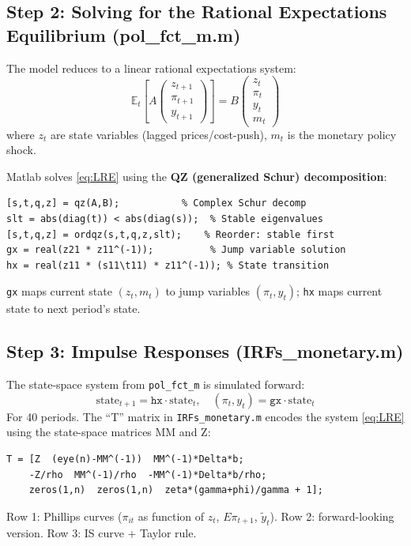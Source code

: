 \documentclass[12pt]{article}
\begin{document}
\subsection{Step 2: Solving for the Rational Expectations Equilibrium (pol\_fct\_m.m)}

The model reduces to a linear rational expectations system:
\begin{equation}
    \mathbb{E}_t\left[A \begin{pmatrix}z_{t+1}\\\pi_{t+1}\\y_{t+1}\end{pmatrix}\right] = B \begin{pmatrix}z_t\\\pi_t\\y_t\\m_t\end{pmatrix}
    \label{eq:LRE}
\end{equation}
where $z_t$ are state variables (lagged prices/cost-push), $m_t$ is the monetary policy shock.

Matlab solves \eqref{eq:LRE} using the \textbf{QZ (generalized Schur) decomposition}:
\begin{verbatim}
[s,t,q,z] = qz(A,B);           % Complex Schur decomp
slt = abs(diag(t)) < abs(diag(s));  % Stable eigenvalues
[s,t,q,z] = ordqz(s,t,q,z,slt);    % Reorder: stable first
gx = real(z21 * z11^(-1));          % Jump variable solution
hx = real(z11 * (s11\t11) * z11^(-1)); % State transition
\end{verbatim}
\texttt{gx} maps current state $(z_t, m_t)$ to jump variables $(\pi_t, y_t)$; \texttt{hx} maps current state to next period's state.

\subsection{Step 3: Impulse Responses (IRFs\_monetary.m)}

The state-space system from \texttt{pol\_fct\_m} is simulated forward:
\begin{equation}
    \text{state}_{t+1} = \texttt{hx} \cdot \text{state}_t, \quad (\pi_t, y_t) = \texttt{gx} \cdot \text{state}_t
\end{equation}
For 40 periods. The ``T'' matrix in \texttt{IRFs\_monetary.m} encodes the system \eqref{eq:LRE} using the state-space matrices MM and Z:
\begin{verbatim}
T = [Z  (eye(n)-MM^(-1))  MM^(-1)*Delta*b;
    -Z/rho  MM^(-1)/rho  -MM^(-1)*Delta*b/rho;
    zeros(1,n)  zeros(1,n)  zeta*(gamma+phi)/gamma + 1];
\end{verbatim}
Row 1: Phillips curves ($\pi_{it}$ as function of $z_t$, $E\pi_{t+1}$, $\tilde{y}_t$). Row 2: forward-looking version. Row 3: IS curve + Taylor rule.
\end{document}

